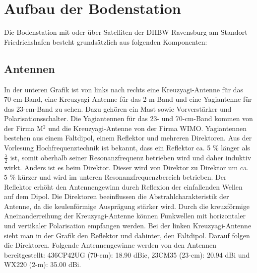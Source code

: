 
\clearpage
\section{Aufbau der Bodenstation}
\label{chap:bodenstation}
Die Bodenstation mit oder über Satelliten der DHBW Ravensburg am Standort Friedrichshafen besteht grundsätzlich aus folgenden 
Komponenten:
\subsection{Antennen}

In der unteren Grafik ist von links nach rechts eine Kreuzyagi-Antenne für das 70-cm-Band, eine Kreuzyagi-Antenne für das 2-m-Band und eine 
Yagiantenne für das 23-cm-Band zu sehen. Dazu gehören ein Mast sowie Vorverstärker und Polarisationsschalter. Die Yagiantennen für das 23- und 
70-cm-Band kommen von der Firma M$^2$ und die Kreuzyagi-Antenne von der Firma WIMO. Yagiantennen bestehen aus einem Faltdipol, einem Reflektor und 
mehreren Direktoren. Aus der Vorlesung Hochfrequenztechnik \cite{hfscript} ist bekannt, dass ein Reflektor ca. 5 $\%$ länger als $\frac{\lambda}{2}$ 
ist, somit oberhalb seiner Resonanzfrequenz betrieben wird und daher induktiv wirkt.  Anders ist es beim Direktor. Dieser wird von Direktor zu 
Direktor um ca. 5 $\%$ kürzer und wird im unteren Resonanzfrequenzbereich betrieben. Der Reflektor erhöht den Antennengewinn durch Reflexion der 
einfallenden Wellen auf dem Dipol. Die Direktoren beeinflussen die Abstrahlcharakteristik der Antenne, da die keulenförmige Ausprägung stärker wird.  
Durch die kreuzförmige Aneinanderreihung der Kreuzyagi-Antenne können Funkwellen mit horizontaler und vertikaler Polarisation empfangen werden. Bei 
der linken Kreuzyagi-Antenne sieht man in der Grafik den Reflektor und dahinter, den Faltdipol. Darauf folgen die Direktoren. Folgende 
Antennengewinne werden von den Antennen bereitgestellt: 436CP42UG (70-cm): 18.90 dBic, 23CM35 (23-cm): 20.94 dBi und WX220 (2-m): 35.00 dBi.

